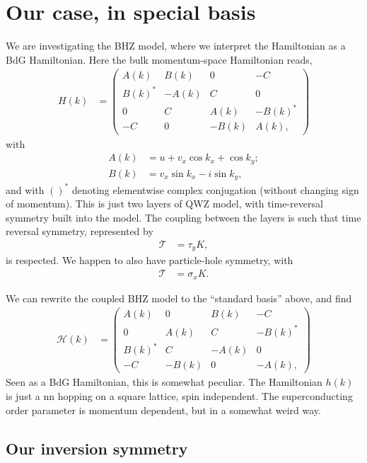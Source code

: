 \documentclass[aps,prb,twocolumn,showpacs,superscriptaddress,10p,longbibliography]{revtex4-1}
\newcommand{\Hbdg}{\mathcal{H}}
\begin{document}
\section{Our case, in special basis}

We are investigating the BHZ model, where we interpret the Hamiltonian
as a BdG Hamiltonian. Here the bulk momentum-space Hamiltonian reads,
\begin{align}
  \label{eq:coupled_BHZ}
  H(k) &=
  \begin{pmatrix}
  A(k) & B(k) & 0 & -C \\
  B(k)^\ast & -A(k) & C & 0 \\
  0 & C & A(k) & -B(k)^\ast \\
  -C & 0 & -B(k) & A(k),
  \end{pmatrix}
\end{align}
with
\begin{align}
  A(k) &= u + v_x \cos k_x + \cos k_y;\\
  B(k) &= v_x \sin k_x - i\sin k_y,
\end{align}
and with $()^\ast$ denoting elementwise complex conjugation (without
changing sign of momentum).  This is just two layers of QWZ model,
with time-reversal symmetry built into the model.
The coupling between the layers is such that time reversal
symmetry, represented by
\begin{align}
  \mathcal{T} &= \tau_y K,
\end{align}
is respected.
We happen to also have particle-hole symmetry, with 
\begin{align}
  \mathcal{T} &= \sigma_x K.
\end{align}

We can rewrite the coupled BHZ model to the ``standard basis'' above, and find
\begin{align}
  \Hbdg(k) &=
  \begin{pmatrix}
  A(k) & 0 & B(k) & -C \\
  0 & A(k) & C & -B(k)^\ast \\
  B(k)^\ast & C & -A(k) & 0 \\
  -C & -B(k) & 0 & -A(k),
  \end{pmatrix}
\end{align}
Seen as a BdG Hamiltonian, this is somewhat peculiar. The Hamiltonian
$h(k)$ is just a nn hopping on a square lattice, spin independent.
The superconducting order parameter is momentum dependent, but in a
somewhat weird way.

\subsection{Our inversion symmetry}
\end{document}

